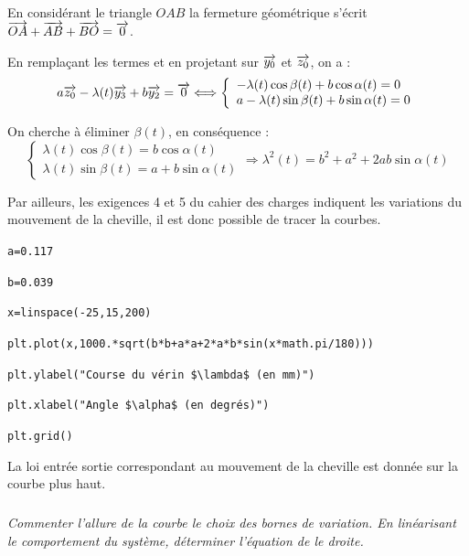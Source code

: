 \documentclass[10pt,fleqn]{article} %
\begin{document}
\ifprof
\begin{corrige}
En considérant le triangle $OAB$ la fermeture géométrique s'écrit $\overrightarrow{OA}+\overrightarrow{AB}+\overrightarrow{BO}=\overrightarrow{0}$.

En remplaçant les termes et en projetant sur $\overrightarrow{y_0}$ et $\overrightarrow{z_0}$, on a :
$$
a\overrightarrow{z_{0}} - \lambda(t)\overrightarrow{y_3}+b\overrightarrow{y_2} = \overrightarrow{0} \Longleftrightarrow
\left\{
\begin{array}{l}
-\lambda(t)\cos \beta(t) +b\cos \alpha(t) = 0  \\
a -\lambda(t)\sin \beta(t) +b\sin \alpha(t) = 0
\end{array}
\right.
$$

On cherche à éliminer $\beta(t)$, en conséquence :
$$
\left\{
\begin{array}{l}
\lambda(t)\cos \beta(t)  = b\cos \alpha(t)  \\
\lambda(t)\sin \beta(t)  = a+ b\sin \alpha(t) 
\end{array}
\right.
\Longrightarrow
\lambda^2(t) = b^2 + a^2 + 2 a b \sin \alpha (t)
$$

Par ailleurs, les exigences 4 et 5 du cahier des charges indiquent les variations du mouvement de la cheville, il est donc possible de tracer la courbes.


\texttt{a=0.117}

\texttt{b=0.039}

\texttt{x=linspace(-25,15,200)}

\texttt{plt.plot(x,1000.*sqrt(b*b+a*a+2*a*b*sin(x*math.pi/180)))}

\texttt{plt.ylabel("Course du vérin \$\textbackslash  lambda\$ (en mm)")}

\texttt{plt.xlabel("Angle \$\textbackslash alpha\$ (en degrés)")}

\texttt{plt.grid()}
\end{corrige}

\else
\fi

\ifprof
\else
\vspace{.5cm}

La loi entrée sortie correspondant au mouvement de la cheville est donnée sur la courbe plus haut.


\fi

\subparagraph{}
\textit{Commenter l'allure de la courbe le choix des bornes de variation. En linéarisant le comportement du système, déterminer l'équation de le droite.}
\end{document}
